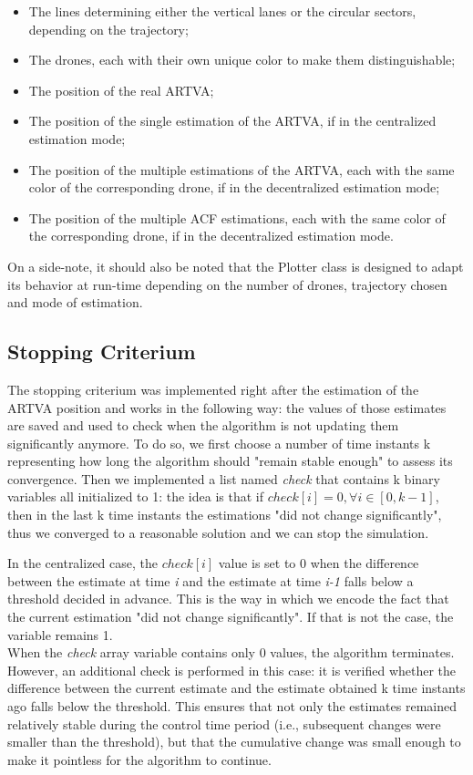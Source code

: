 \begin{itemize}
    \item The lines determining either the vertical lanes or the circular sectors, depending on the trajectory; 
    \item The drones, each with their own unique color to make them distinguishable;
    \item The position of the real ARTVA; 
    \item The position of the single estimation of the ARTVA, if in the centralized estimation mode; 
    \item The position of the multiple estimations of the ARTVA, each with the same color of the corresponding drone, if in the decentralized estimation mode; 
    \item The position of the multiple ACF estimations, each with the same color of the corresponding drone, if in the decentralized estimation mode. 
\end{itemize}
On a side-note, it should also be noted that the Plotter class is designed to adapt its behavior at run-time depending on the number of drones, trajectory chosen and mode of estimation.

\subsection{Stopping Criterium}
The stopping criterium was implemented right after the estimation of the ARTVA position and works in the following way: the values of those estimates are saved and used to check when the algorithm is not updating them significantly anymore. To do so, we first choose a number of time instants k representing how long the algorithm should "remain stable enough" to assess its convergence. Then we implemented a list named \textit{check} that contains k binary variables all initialized to 1: the idea is that if $check[i] = 0, \forall i \in [0,k-1]$, then in the last k time instants the estimations "did not change significantly", thus we converged to a reasonable solution and we can stop the simulation.

In the centralized case, the $check[i]$ value is set to 0 when the difference between the estimate at time \textit{i} and the estimate at time \textit{i-1} falls below a threshold decided in advance. This is the way in which we encode the fact that the current estimation "did not change significantly". If that is not the case, the variable remains 1.\\
When the \textit{check} array variable contains only 0 values, the algorithm terminates. However, an additional check is performed in this case: it is verified whether the difference between the current estimate and the estimate obtained k time instants ago falls below the threshold. This ensures that not only the estimates remained relatively stable during the control time period (i.e., subsequent changes were smaller than the threshold), but that the cumulative change was small enough to make it pointless for the algorithm to continue.

